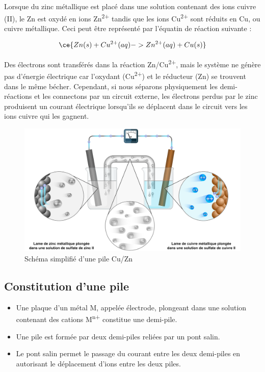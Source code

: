 \documentclass[
  11pt,
  a4paper,
  openany]{book}
\providecommand{\tightlist}{%
  \setlength{\itemsep}{0pt}\setlength{\parskip}{0pt}}
\begin{document}
Lorsque du zinc métallique est placé dans une solution contenant des ions cuivre (II), le Zn est oxydé en ions Zn\textsuperscript{2+} tandis que les ions Cu\textsuperscript{2+} sont réduits en Cu, ou cuivre métallique. Ceci peut être représenté par l'équatin de réaction suivante :

\[
\ce{Zn(s) + Cu^{2+}(aq) -> Zn^{2+}(aq) + Cu(s)}
\]

Des électrons sont transférés dans la réaction Zn/Cu\textsuperscript{2+}, mais le système ne génère pas d'énergie électrique car l'oxydant (Cu\textsuperscript{2+}) et le réducteur (Zn) se trouvent dans le même bécher. Cependant, si nous séparons physiquement les demi-réactions et les connectons par un circuit externe, les électrons perdus par le zinc produisent un courant électrique lorsqu'ils se déplacent dans le circuit vers les ions cuivre qui les gagnent.

\begin{figure}

{\centering \includegraphics[width=0.9\linewidth]{images/pile-electrique-v2} 

}

\caption{Schéma simplifié d'une pile Cu/Zn}\label{fig:pile-electrique-v2}
\end{figure}

\subsection{Constitution d'une pile}\label{constitution-dune-pile}

\begin{itemize}
\tightlist
\item
  Une plaque d'un métal M, appelée électrode, plongeant dans une solution contenant des cations M\textsuperscript{n+} constitue une demi-pile.
\item
  Une pile est formée par deux demi-piles reliées par un pont salin.
\item
  Le pont salin permet le passage du courant entre les deux demi-piles en autorisant le déplacement d'ions entre les deux piles.
\end{itemize}
\end{document}
